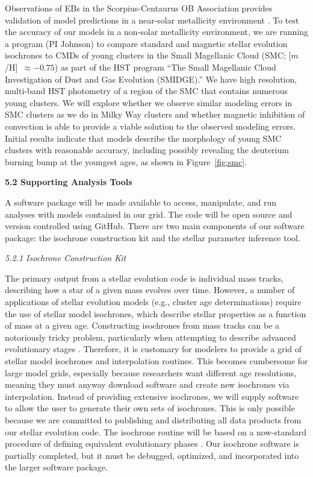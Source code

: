 Observations of EBs in the Scorpius-Centaurus OB Association provides validation of model predictions in a near-solar metallicity environment \citep{}. To test the accuracy of our models in a non-solar metallicity environment, we are running a program (PI Johnson) to compare standard and magnetic stellar evolution isochrones to CMDs of young clusters in the Small Magellanic Cloud (SMC; [$m$/H]~$\approx -0.75$) as part of the HST program ``The Small Magellanic Cloud Investigation of Dust and Gas Evolution (SMIDGE).'' We have high resolution, multi-band HST photometry of a region of the SMC that contains numerous young clusters. We will explore whether we observe similar modeling errors in SMC clusters as we do in Milky Way clusters and whether magnetic inhibition of convection is able to provide a viable solution to the observed modeling errors. Initial results indicate that models describe the morphology of young SMC clusters with reasonable accuracy, including possibly revealing the deuterium burning bump at the youngest ages, as shown in Figure~\ref{fig:smc}. 

{\bf 5.2 Supporting Analysis Tools}

A software package will be made available to access, manipulate, and run analyses with models contained in our grid. The code will be open source and version controlled using GitHub. There are two main components of our software package: the isochrone construction kit and the stellar parameter inference tool. 

{\it 5.2.1 Isochrone Construction Kit}

The primary output from a stellar evolution code is individual mass tracks, describing how a star of a given mass evolves over time. However, a number of applications of stellar evolution models (e.g., cluster age determinations) require the use of stellar model isochrones, which describe stellar properties as a function of mass at a given age. Constructing isochrones from mass tracks can be a notoriously tricky problem, particularly when attempting to describe advanced evolutionary stages \citep[see, e.g.,][]{Bergbusch1992, Dotter2016}. Therefore, it is customary for modelers to provide a grid of stellar model isochrones and interpolation routines. This becomes cumbersome for large model grids, especially because researchers want different age resolutions, meaning they must anyway download software and create new isochrones via interpolation. Instead of providing extensive isochrones, we will supply software to allow the user to generate their own sets of isochrones. This is only possible because we are committed to publishing and distributing all data products from our stellar evolution code. The isochrone routine will be based on a now-standard procedure of defining equivalent evolutionary phases \citep[EEPs;][]{Bergbusch1992}. Our isochrone software is partially completed, but it must be debugged, optimized, and incorporated into the larger software package.

